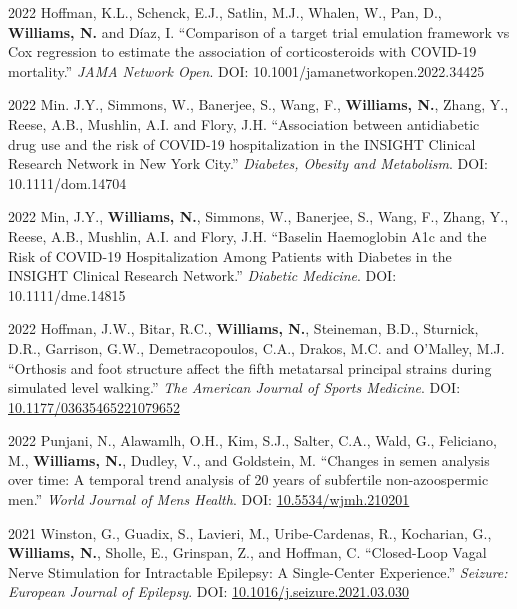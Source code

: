 \documentclass[12pt,letterpaper]{report}
\begin{document}
\begin{tablist}
            	\item[2022]\tab Hoffman, K.L., Schenck, E.J., Satlin, M.J., Whalen, W., Pan, D., \textbf{Williams, N.} and Díaz, I. \enquote{Comparison of a target trial emulation framework vs Cox regression to estimate the association of corticosteroids with COVID-19 mortality.} \textit{JAMA Network Open}. DOI: 10.1001/jamanetworkopen.2022.34425

    \item[2022] \tab Min. J.Y., Simmons, W., Banerjee, S., Wang, F., \textbf{Williams, N.}, Zhang, Y., Reese, A.B., Mushlin, A.I. and Flory, J.H. \enquote{Association between antidiabetic drug use and the risk of COVID-19 hospitalization in the INSIGHT Clinical Research Network in New York City.} \textit{Diabetes, Obesity and Metabolism}. DOI: 10.1111/dom.14704
    
    \item[2022] \tab Min, J.Y., \textbf{Williams, N.}, Simmons, W., Banerjee, S., Wang, F., Zhang, Y., Reese, A.B., Mushlin, A.I. and Flory, J.H. \enquote{Baselin Haemoglobin A1c and the Risk of COVID-19 Hospitalization Among Patients with Diabetes in the INSIGHT Clinical Research Network.} \textit{Diabetic Medicine}. DOI: 10.1111/dme.14815 
    
    \item[2022] \tab Hoffman, J.W., Bitar, R.C., \textbf{Williams, N.}, Steineman, B.D., Sturnick, D.R., Garrison, G.W., Demetracopoulos, C.A., Drakos, M.C. and O'Malley, M.J. \enquote{Orthosis and foot structure affect the fifth metatarsal principal strains during simulated level walking.} \textit{The American Journal of Sports Medicine}. DOI: \href{https://doi.org/10.1177/03635465221079652}{10.1177/03635465221079652}
    
    \item[2022] \tab Punjani, N., Alawamlh, O.H., Kim, S.J., Salter, C.A., Wald, G., Feliciano, M., \textbf{Williams, N.}, Dudley, V., and Goldstein, M. \enquote{Changes in semen analysis over time: A temporal trend analysis of 20 years of subfertile non-azoospermic men.} \textit{World Journal of Mens Health}. DOI: \href{https://doi.org/10.5534/wjmh.210201}{10.5534/wjmh.210201}
    
     \item[2021] \tab Winston, G., Guadix, S., Lavieri, M., Uribe-Cardenas, R., Kocharian, G., \textbf{Williams, N.}, Sholle, E., Grinspan, Z., and Hoffman, C. \enquote{Closed-Loop Vagal Nerve Stimulation for Intractable Epilepsy: A Single-Center Experience.} \textit{Seizure: European Journal of Epilepsy}. DOI: \href{https://doi.org/10.1016/j.seizure.2021.03.030}{10.1016/j.seizure.2021.03.030}
    

\end{tablist}
\end{document}

